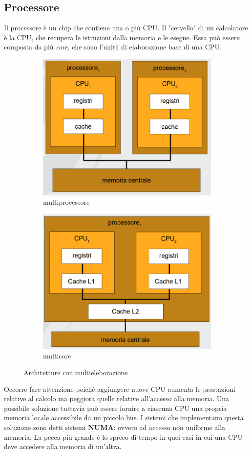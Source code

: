 \subsection{Processore}
Il processore è un chip che contiene una o più CPU.
Il "cervello" di un calcolatore è la CPU, che recupera le istruzioni dalla memoria e le esegue. 
Essa può essere composta da più \textit{core}, che sono l'unità di elaborazione base di una CPU.

\begin{figure}[h!]
  \begin{subfigure}{.5\textwidth}
  \centering
    \includegraphics[width=0.7\linewidth]{assets/multiprocessore1.png}
    \caption{multiprocessore}
  \end{subfigure}%
  \begin{subfigure}{.5\textwidth}
  \centering
    \includegraphics[width=0.7\linewidth]{assets/multicore1.png}
    \caption{multicore}
  \end{subfigure}
  \caption{Architetture con multieleborazione}
\end{figure}

Occorre fare attenzione poiché aggiungere nuove CPU aumenta le prestazioni relative al calcolo ma peggiora quelle relative all'accesso alla memoria. Una possibile soluzione tuttavia può essere fornire a ciascuna CPU una propria memoria locale accessibile da un piccolo bus. I sistemi che implementano questa soluzione sono detti sistemi \textbf{NUMA}: ovvero ad accesso non uniforme alla memoria. La pecca più grande è lo spreco di tempo in quei casi in cui una CPU deve accedere alla memoria di un'altra.

